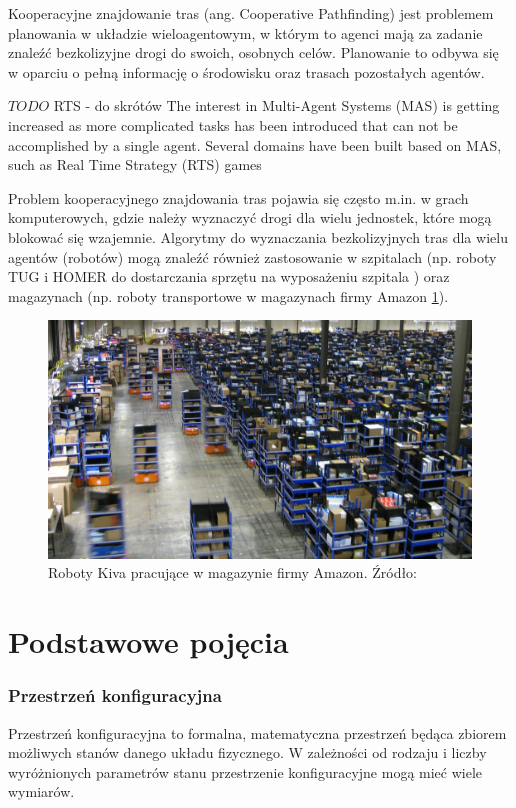 Kooperacyjne znajdowanie tras (ang. Cooperative Pathfinding) jest problemem planowania w układzie wieloagentowym, w którym to agenci mają za zadanie znaleźć bezkolizyjne drogi do swoich, osobnych celów. Planowanie to odbywa się w oparciu o pełną informację o środowisku oraz trasach pozostałych agentów. \cite{cooppath}

$TODO$ RTS - do skrótów
The interest in Multi-Agent Systems (MAS) is getting increased as more
complicated tasks has been introduced that can not be accomplished by a
single agent. Several domains have been built based on MAS, such as Real
Time Strategy (RTS) games 

Problem kooperacyjnego znajdowania tras pojawia się często m.in. w grach komputerowych, gdzie należy wyznaczyć drogi dla wielu jednostek, które mogą blokować się wzajemnie. Algorytmy do wyznaczania bezkolizyjnych tras dla wielu agentów (robotów) mogą znaleźć również zastosowanie w szpitalach (np. roboty TUG i HOMER do dostarczania sprzętu na wyposażeniu szpitala \cite{tughomer}) oraz magazynach (np. roboty transportowe w magazynach firmy Amazon \ref{fig:image_kiva_amazon}).

\begin{figure}[H]
	\centering
	\includegraphics[width=14cm]{img/kiva-amazon}
	\caption{Roboty Kiva pracujące w magazynie firmy Amazon. Źródło: \cite{amazonkiva}}
	\label{fig:image_kiva_amazon}
\end{figure}

\section{Podstawowe pojęcia}
\subsubsection{Przestrzeń konfiguracyjna}
Przestrzeń konfiguracyjna to formalna, matematyczna przestrzeń będąca zbiorem możliwych stanów danego układu fizycznego.
W zależności od rodzaju i liczby wyróżnionych parametrów stanu przestrzenie konfiguracyjne mogą mieć wiele wymiarów.

